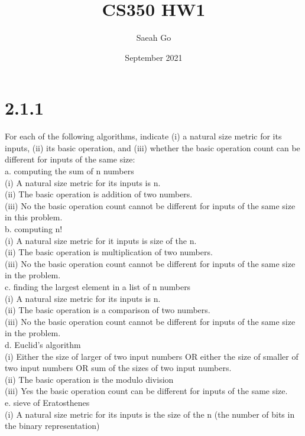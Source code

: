 \documentclass[8pt, letterpaper]{article}
\title{CS350 HW1}
\author{Saeah Go}
\date{September 2021}
\begin{document}
\maketitle

\section{2.1.1}
For each of the following algorithms, indicate (i) a natural size metric for its inputs, (ii) its basic operation, and (iii) whether the basic operation count can be different for inputs of the same size:\\
a. computing the sum of n numbers\\
    \indent(i) A natural size metric for its inputs is n. \\
    \indent(ii) The basic operation is addition of two numbers.\\
    \indent(iii) No the basic operation count cannot be different for inputs of the same size in this problem.\\
b. computing n!\\
    \indent(i) A natural size metric for it inputs is size of the n. \\
    \indent(ii) The basic operation is multiplication of two numbers.\\
    \indent(iii) No the basic operation count cannot be different for inputs of the same size in the problem.\\
c. finding the largest element in a list of n numbers\\
    \indent(i) A natural size metric for its inputs is n. \\
    \indent(ii) The basic operation is a comparison of two numbers. \\
    \indent(iii) No the basic operation count cannot be different for inputs of the same size in the problem. \\
d. Euclid’s algorithm\\
    \indent(i) Either the size of larger of two input numbers OR either the size of smaller of two input numbers OR sum of the sizes of two input numbers. \\
    \indent(ii) The basic operation is the modulo division\\
    \indent(iii) Yes the basic operation count can be different for inputs of the same size. \\
e. sieve of Eratosthenes\\
    \indent(i) A natural size metric for its inputs is the size of the n (the number of bits in the binary representation) \\
\end{document}
